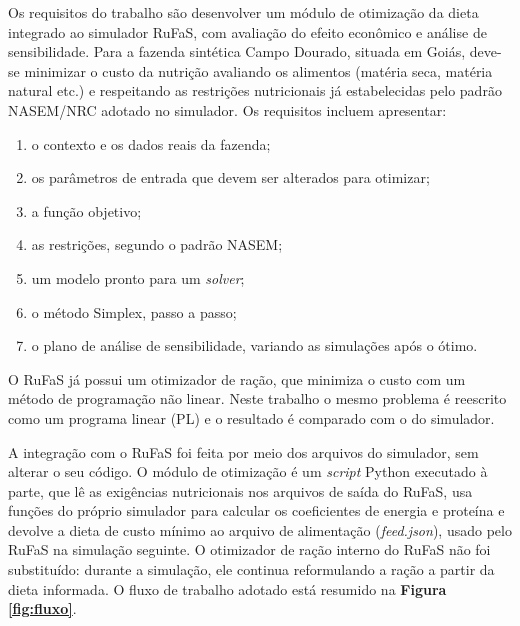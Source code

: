 \documentclass[a4paper,12pt]{article}
\begin{document}
Os requisitos do trabalho são desenvolver um módulo de otimização da dieta integrado ao simulador RuFaS, com avaliação do efeito econômico e análise de sensibilidade. Para a fazenda sintética Campo Dourado, situada em Goiás, deve-se minimizar o custo da nutrição avaliando os alimentos (matéria seca, matéria natural etc.) e respeitando as restrições nutricionais já estabelecidas pelo padrão NASEM/NRC adotado no simulador. Os requisitos incluem apresentar:

\begin{enumerate}
    \item o contexto e os dados reais da fazenda;
    \item os parâmetros de entrada que devem ser alterados para otimizar;
    \item a função objetivo;
    \item as restrições, segundo o padrão NASEM;
    \item um modelo pronto para um \textit{solver};
    \item o método Simplex, passo a passo;
    \item o plano de análise de sensibilidade, variando as simulações após o ótimo.
\end{enumerate}

O RuFaS já possui um otimizador de ração, que minimiza o custo com um método de programação não linear. Neste trabalho o mesmo problema é reescrito como um programa linear (PL) e o resultado é comparado com o do simulador.

A integração com o RuFaS foi feita por meio dos arquivos do simulador, sem alterar o seu código. O módulo de otimização é um \textit{script} Python executado à parte, que lê as exigências nutricionais nos arquivos de saída do RuFaS, usa funções do próprio simulador para calcular os coeficientes de energia e proteína e devolve a dieta de custo mínimo ao arquivo de alimentação (\textit{feed.json}), usado pelo RuFaS na simulação seguinte. O otimizador de ração interno do RuFaS não foi substituído: durante a simulação, ele continua reformulando a ração a partir da dieta informada. O fluxo de trabalho adotado está resumido na \textbf{Figura \ref{fig:fluxo}}.
\end{document}
